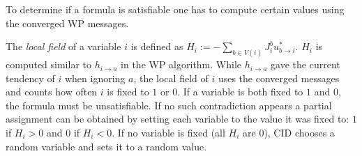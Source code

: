 To determine if a formula is satisfiable one has to compute certain values using the converged WP messages.

The \emph{local field} of a variable $i$ is defined as $H_i := - \sum_{b \in V(i)} J_i^b u^\ast_{b\rightarrow i}$. \newline $H_i$ is computed similar to $h_{i \rightarrow a}$ in the WP algorithm. While 
$h_{i \rightarrow a}$ gave the current tendency of $i$ when ignoring $a$, the local field of $i$ uses the converged messages and counts how often $i$ is fixed to $1$ or $0$. \newline
If a variable is both fixed to $1$ and $0$, the formula must be unsatisfiable. \newline
If no such contradiction appears a partial assignment can be obtained by setting each variable to the value it was fixed to: $1$ if $H_i > 0$ and $0$ if $H_i < 0$. If no variable is fixed (all $H_i$ are $0$), CID chooses a random variable and sets it to a random value.





\newpage